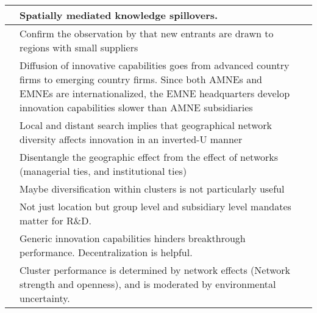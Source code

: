 \documentclass[12pt]{article}
\begin{document}
\begin{center}
\begin{longtable}{|p{}|p{}|p{}|}
\cite{Jaffe1989} &Spatially mediated knowledge spillovers.&\\\hline

\cite{Glaeser2009} & Confirm the observation by \cite{Chinitz1961} that new entrants are drawn to regions with small suppliers &\\\hline


\cite{Awate2015} & Diffusion of innovative capabilities goes from advanced country firms to emerging country firms. Since both AMNEs and EMNEs are internationalized, the EMNE headquarters develop innovation capabilities slower than AMNE subsidiaries&\\\hline

\cite{Bahlmann2014} & Local and distant search implies that geographical network diversity affects innovation in an inverted-U manner&\\\hline

\cite{Bell2005} & Disentangle the geographic effect from the effect of networks (managerial ties, and institutional ties)&\\\hline

\cite{Baptista1998} & Maybe diversification within clusters is not particularly useful&\\\hline

\cite{Cantwell2005} & Not just location but group level and subsidiary level mandates matter for R\&D.&\\\hline


\cite{Dunlap-Hinkler2010} & Generic innovation capabilities hinders breakthrough performance. Decentralization is helpful.&\\\hline

\cite{Eisingerich2010} & Cluster performance is determined by network effects (Network strength and openness), and is moderated by environmental uncertainty.&\\\hline


\end{longtable}
\end{center}
\end{document}
